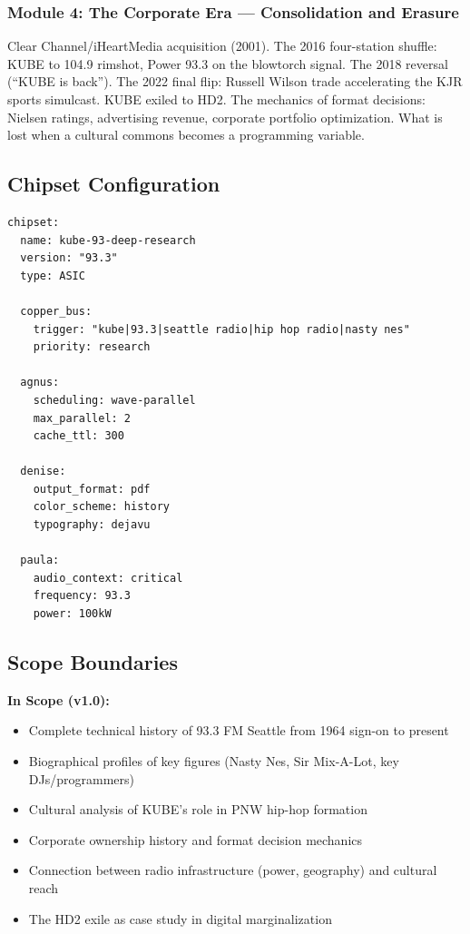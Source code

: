 \documentclass[11pt,letterpaper]{article}
\begin{document}
\subsubsection{Module 4: The Corporate Era --- Consolidation and Erasure}
Clear Channel/iHeartMedia acquisition (2001). The 2016 four-station shuffle: KUBE to 104.9 rimshot, Power 93.3 on the blowtorch signal. The 2018 reversal (``KUBE is back''). The 2022 final flip: Russell Wilson trade accelerating the KJR sports simulcast. KUBE exiled to HD2. The mechanics of format decisions: Nielsen ratings, advertising revenue, corporate portfolio optimization. What is lost when a cultural commons becomes a programming variable.

\subsection{Chipset Configuration}

\begin{asciibox}
\begin{verbatim}
chipset:
  name: kube-93-deep-research
  version: "93.3"
  type: ASIC

  copper_bus:
    trigger: "kube|93.3|seattle radio|hip hop radio|nasty nes"
    priority: research

  agnus:
    scheduling: wave-parallel
    max_parallel: 2
    cache_ttl: 300

  denise:
    output_format: pdf
    color_scheme: history
    typography: dejavu

  paula:
    audio_context: critical
    frequency: 93.3
    power: 100kW
\end{verbatim}
\end{asciibox}

\subsection{Scope Boundaries}

\textbf{In Scope (v1.0):}
\begin{itemize}[leftmargin=2em]
\item Complete technical history of 93.3 FM Seattle from 1964 sign-on to present
\item Biographical profiles of key figures (Nasty Nes, Sir Mix-A-Lot, key DJs/programmers)
\item Cultural analysis of KUBE's role in PNW hip-hop formation
\item Corporate ownership history and format decision mechanics
\item Connection between radio infrastructure (power, geography) and cultural reach
\item The HD2 exile as case study in digital marginalization
\end{itemize}
\end{document}
